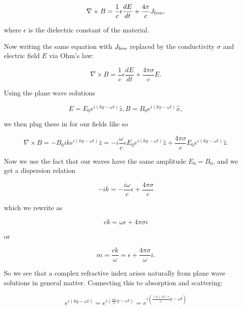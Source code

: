\documentclass{article}
\begin{document}
\begin{equation}
\nabla \times B = \frac{1}{c} \epsilon \frac{d E}{d t} + \frac{4 \pi}{c} J_{\rm{free}},
\end{equation}

where $\epsilon$ is the dielectric constant of the material.

Now writing the same equation with $J_{\rm{free}}$ replaced by the conductivity $\sigma$ and electric field $E$ via Ohm's law:

\begin{equation}
\nabla \times B = \frac{1}{c} \epsilon \frac{d E}{d t} + \frac{4 \pi \sigma}{c} E.
\end{equation}

Using the plane wave solutions

\begin{equation}
E = E_{0} e^{i(k y - \omega t)} \hat{z}, B = B_{0} e^{i(k y - \omega t)} \hat{x},
\end{equation}

we then plug these in for our fields like so

\begin{equation}
\nabla \times B = - B_{0} i k e^{i(k y - \omega t)} \hat{z} = - i \frac{\omega}{c} \epsilon E_{0}  e^{i(k y - \omega t)} \hat{z} + \frac{4 \pi \sigma}{c} E_{0} e^{i(k y - \omega t)} \hat{z}.
\end{equation}

Now we use the fact that our waves have the same amplitude $E_{0} = B_{0}$, and we get a dispersion relation

\begin{equation}
-i k = -\frac{i \omega}{c} \epsilon + \frac{4 \pi \sigma}{c} 
\end{equation}

which we rewrite as

\begin{equation}
ck = \omega \epsilon + 4 \pi \sigma i
\end{equation}

or 

\begin{equation}
m = \frac{c k}{\omega} = \epsilon + \frac{4 \pi \sigma}{\omega}i.
\end{equation}

So we see that a complex refractive index arises naturally from plane wave solutions in general matter. Connecting this to absorption and scattering:

\begin{equation}
e^{i(k y - \omega t)} = e^{i(\frac{m c}{\omega} y - \omega t)} = e^{i(\frac{(n + i k) c}{\omega} y - \omega t)}
\end{equation}
\end{document}
